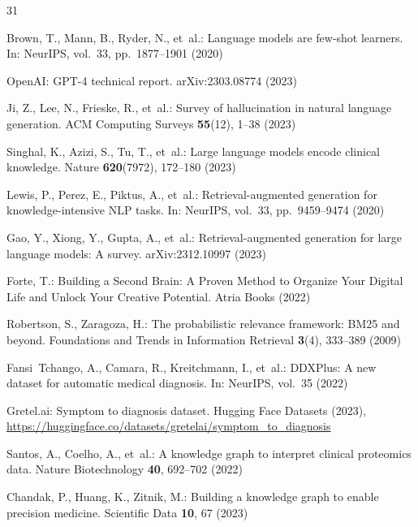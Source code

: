 \documentclass[runningheads]{llncs}
\begin{document}


\begin{thebibliography}{31}

Brown, T., Mann, B., Ryder, N., et~al.: Language models are few-shot learners. In: NeurIPS, vol.~33, pp.~1877--1901 (2020)

OpenAI: GPT-4 technical report. arXiv:2303.08774 (2023)

Ji, Z., Lee, N., Frieske, R., et~al.: Survey of hallucination in natural language generation. ACM Computing Surveys \textbf{55}(12), 1--38 (2023)

Singhal, K., Azizi, S., Tu, T., et~al.: Large language models encode clinical knowledge. Nature \textbf{620}(7972), 172--180 (2023)

Lewis, P., Perez, E., Piktus, A., et~al.: Retrieval-augmented generation for knowledge-intensive NLP tasks. In: NeurIPS, vol.~33, pp.~9459--9474 (2020)

Gao, Y., Xiong, Y., Gupta, A., et~al.: Retrieval-augmented generation for large language models: A survey. arXiv:2312.10997 (2023)

Forte, T.: Building a Second Brain: A Proven Method to Organize Your Digital Life and Unlock Your Creative Potential. Atria Books (2022)

Robertson, S., Zaragoza, H.: The probabilistic relevance framework: BM25 and beyond. Foundations and Trends in Information Retrieval \textbf{3}(4), 333--389 (2009)

Fansi~Tchango, A., Camara, R., Kreitchmann, I., et~al.: DDXPlus: A new dataset for automatic medical diagnosis. In: NeurIPS, vol.~35 (2022)

Gretel.ai: Symptom to diagnosis dataset. Hugging Face Datasets (2023), \url{https://huggingface.co/datasets/gretelai/symptom_to_diagnosis}

Santos, A., Coelho, A., et~al.: A knowledge graph to interpret clinical proteomics data. Nature Biotechnology \textbf{40}, 692--702 (2022)

Chandak, P., Huang, K., Zitnik, M.: Building a knowledge graph to enable precision medicine. Scientific Data \textbf{10}, 67 (2023)


\end{thebibliography}
\end{document}

